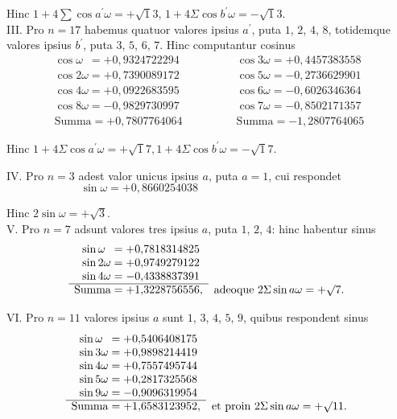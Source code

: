 \documentclass[twoside,12pt]{memoir}
\begin{document}
Hinc \(1+4 \sum \cos a^{\prime} \omega=+\surd 13\), \(1+4 \Sigma \cos b^{\prime} \omega=-\surd 13\).\\

III. Pro \(n=17\) habemus quatuor valores ipsius \(a^{\prime}\), puta \(1\), \(2\), \(4\), \(8\), totidemque valores ipsius \(b^{\prime}\), puta \(3\), \(5\), \(6\), \(7\). Hinc computantur cosinus
\[\begin{array}{r}
\cos \omega\phantom{1}  =+0{,}9324722294 \\
\cos 2 \omega  =+0{,}7390089172 \\
\cos 4 \omega  =+0{,}0922683595 \\
\cos 8 \omega  =-0{,}9829730997 \\
\hline \text{Summa} =+0{,}7807764064 
\end{array}
\qquad \qquad
\begin{array}{r}
\cos 3 \omega  =+0{,}4457383558 \\
\cos 5 \omega  =-0{,}2736629901 \\
\cos 6 \omega  =-0{,}6026346364 \\
\cos 7 \omega  =-0{,}8502171357 \\
\hline \text{Summa} =-1{,}2807764065
\end{array}\]
 
Hinc \(1+4 \Sigma \cos a^{\prime} \omega=+\surd 17,1+4 \Sigma \cos b^{\prime} \omega=-\surd 17\).\\\pagebreak%

IV. Pro \(n=3\) adest valor unicus ipsius \(a\), puta \(a=1\), cui respondet 
\[\sin \omega=+0{,}8660254038 \quad\quad \phantom{\sin \omega=+0{,}8660254038}\]
 
Hinc \(2 \sin \omega=+\surd 3\).\\

V. Pro \(n=7\) adsunt valores tres ipsius \(a\), puta \(1\), \(2\), \(4\): hinc habentur sinus
\[\begin{array}{rl}
 \sin \omega\phantom{1} =+0{,}7818314825 \phantom{,}&\\
\sin 2 \omega  =+0{,}9749279122 \phantom{,}&\\
\sin 4 \omega  =-0{,}4338837391 \phantom{,}&\\
\cline{1-1} \text{Summa}  =+1{,}3228756556,& \text{adeoque } 2 \Sigma \sin a \omega=+\surd 7.
\end{array}\]

VI. Pro \(n=11\) valores ipsius \(a\) sunt \(1\), \(3\), \(4\), \(5\), \(9\), quibus respondent sinus
\[\begin{array}{rl}
\sin \omega\phantom{1}  =+0{,}5406408175 \phantom{,}&\\
\sin 3 \omega  =+0{,}9898214419 \phantom{,}&\\
\sin 4 \omega  =+0{,}7557495744 \phantom{,}&\\
\sin 5 \omega  =+0{,}2817325568 \phantom{,}&\\
\sin 9 \omega  =-0{,}9096319954 \phantom{,}&\\
\cline{1-1} \text{Summa} =+1{,}6583123952,& \text{et proin } 2 \Sigma \sin a \omega=+\surd 11.
\end{array}\]
\end{document}
